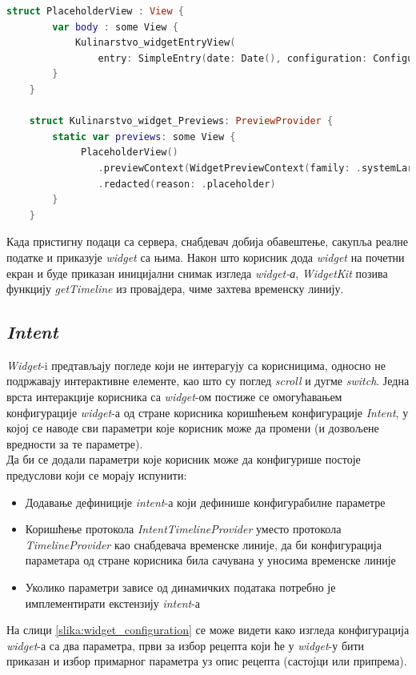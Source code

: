 \documentclass[12pt,oneside]{memoir}
\begin{document}
\begin{lstlisting}[caption=\textit{{Widget - placeholder}}, label={lst:Widget - placeholder}, language=Swift, frame=single]
    struct PlaceholderView : View {
        var body : some View {
            Kulinarstvo_widgetEntryView(
                entry: SimpleEntry(date: Date(), configuration: ConfigurationIntent(), recipe: Datafeed.shared.favRecipes[0], parameterToShow: MainParameter.Sastojci.rawValue))
        }
    }
    
    struct Kulinarstvo_widget_Previews: PreviewProvider {
        static var previews: some View {
             PlaceholderView()
                .previewContext(WidgetPreviewContext(family: .systemLarge))
                .redacted(reason: .placeholder)
        }
    }
\end{lstlisting}

\indent Када пристигну подаци са сервера, снабдевач добија обавештење, сакупља реалне податке и приказује \textit{widget} са њима. Након што корисник дода \textit{widget} на почетни екран и буде приказан иницијални снимак изгледа \textit{widget-а}, \textit{WidgetKit} позива функцију \textit{getTimeline} из провајдера, чиме захтева временску линију.

\subsection{\textit{Intent}}
\label{subsec:Intent}
\indent \textit{Widget}-i предтављају погледе који не интерагују са корисницима, односно не подржавају интерактивне елементе, као што су поглед \textit{scroll} и дугме \textit{switch}. Једна врста интеракције корисника са \textit{widget}-ом постиже се омогућавањем конфигурације \textit{widget}-а од стране корисника коришћењем конфигурације \textit{Intent}, у којој се наводе сви параметри које корисник може да промени (и дозвољене вредности за те параметре). 
\\
\indent Да би се додали параметри које корисник може да конфигурише постоје предуслови који се морају испунити:
\begin{itemize}
    \item Додавање дефиниције \textit{intent}-а који дефинише конфигурабилне параметре 
    \item Коришћење протокола \textit{IntentTimelineProvider} уместо протокола \textit{TimelineProvider} као снабдевача временске линије, да би конфигурација параметара од стране корисника била сачувана у уносима временске линије
    \item Уколико параметри зависе од динамичких података потребно је имплементирати екстензију \textit{intent}-а
\end{itemize}
На слици \ref{slika:widget_configuration} се може видети како изгледа конфигурација \textit{widget}-а са два параметра, први за избор рецепта који ће у \textit{widget}-у бити приказан и избор примарног параметра уз опис рецепта (састојци или припрема).
\end{document}
